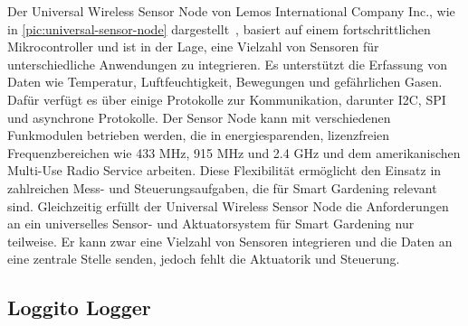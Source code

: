 
Der Universal Wireless Sensor Node von Lemos International Company Inc., wie in \cref{pic:universal-sensor-node} dargestellt~\cite{Universal}, basiert auf einem fortschrittlichen Mikrocontroller und ist in der Lage, eine Vielzahl von Sensoren für unterschiedliche Anwendungen zu integrieren.
Es unterstützt die Erfassung von Daten wie Temperatur, Luftfeuchtigkeit, Bewegungen und gefährlichen Gasen.
Dafür verfügt es über einige Protokolle zur Kommunikation, darunter I2C, SPI und asynchrone Protokolle.
Der Sensor Node kann mit verschiedenen Funkmodulen betrieben werden, die in energiesparenden, lizenzfreien Frequenzbereichen wie 433 MHz, 915 MHz und 2.4 GHz und dem amerikanischen Multi-Use Radio Service arbeiten.
Diese Flexibilität ermöglicht den Einsatz in zahlreichen Mess- und Steuerungsaufgaben, die für Smart Gardening relevant sind.
Gleichzeitig erfüllt der Universal Wireless Sensor Node die Anforderungen an ein universelles Sensor- und Aktuatorsystem für Smart Gardening nur teilweise.
Er kann zwar eine Vielzahl von Sensoren integrieren und die Daten an eine zentrale Stelle senden, jedoch fehlt die Aktuatorik und Steuerung.

\subsection{Loggito Logger}

